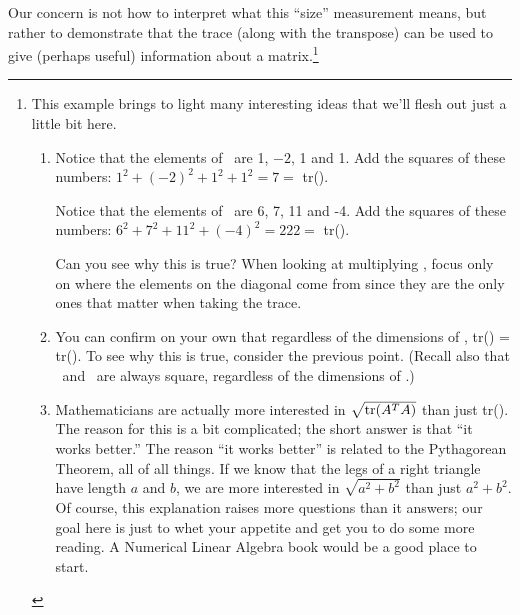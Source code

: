 Our concern is not how to interpret what this ``size'' measurement means, but rather to demonstrate that the trace (along with the transpose) can be used to give (perhaps useful) information about a matrix.\footnote{This example brings to light many interesting ideas that we'll flesh out just a little bit here. 
\begin{enumerate}
\item		Notice that the elements of \tta\ are 1, $-2$,  1 and 1. Add the squares of these numbers: $1^2 + (-2)^2 + 1^2 + 1^2  = 7 = $ tr(\ttat\tta).

				Notice that the elements of \ttb\ are 6, 7, 11 and -4. Add the squares of these numbers: $6^2 + 7^2 + 11^2 + (-4)^2 = 222 =$ tr(\ttbt\ttb).
				
				Can you see why this is true? When looking at multiplying \ttat\tta, focus only on where the elements on the diagonal come from since they are the only ones that matter when taking the trace.

\item		You can confirm on your own that regardless of the dimensions of \tta, tr(\ttat\tta) = tr(\tta\ttat). To see why this is true, consider the previous point. (Recall also that \ttat\tta\ and \tta\ttat\ are always square, regardless of the dimensions of \tta.)

\item		Mathematicians are actually more interested in $\sqrt{\text{tr}(A^TA)}$ than just tr(\ttat\tta). The reason for this is a bit complicated; the short answer is that ``it works better.'' The reason ``it works better'' is related to the Pythagorean Theorem, all of all things. If we know that the legs of a right triangle have length $a$ and $b$, we are more interested in $\sqrt{a^2+b^2}$ than just $a^2+b^2$. Of course, this explanation raises more questions than it answers; our goal here is just to whet your appetite and get you to do some more reading. A Numerical Linear Algebra book would be a good place to start.
\end{enumerate}
}\\





